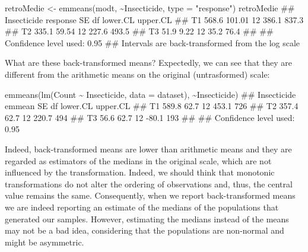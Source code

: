 \documentclass[a4paper,12pt,oneside]{book}
\newenvironment{Shaded}{\begin{snugshade}}{\end{snugshade}}
\newcommand{\SpecialCharTok}[1]{#1}
\newcommand{\StringTok}[1]{#1}
\newcommand{\DocumentationTok}[1]{#1}
\newcommand{\OtherTok}[1]{#1}
\newcommand{\FunctionTok}[1]{#1}
\newcommand{\AttributeTok}[1]{#1}
\newcommand{\NormalTok}[1]{#1}
\begin{document}
\begin{Shaded}
\begin{Highlighting}[]
\NormalTok{retroMedie }\OtherTok{\textless{}{-}} \FunctionTok{emmeans}\NormalTok{(modt, }\SpecialCharTok{\textasciitilde{}}\NormalTok{Insecticide, }
                      \AttributeTok{type =} \StringTok{"response"}\NormalTok{)}
\NormalTok{retroMedie}
\DocumentationTok{\#\#  Insecticide response     SE df lower.CL upper.CL}
\DocumentationTok{\#\#  T1             568.6 101.01 12    386.1    837.3}
\DocumentationTok{\#\#  T2             335.1  59.54 12    227.6    493.5}
\DocumentationTok{\#\#  T3              51.9   9.22 12     35.2     76.4}
\DocumentationTok{\#\# }
\DocumentationTok{\#\# Confidence level used: 0.95 }
\DocumentationTok{\#\# Intervals are back{-}transformed from the log scale}
\end{Highlighting}
\end{Shaded}

What are these back-transformed means? Expectedly, we can see that they are different from the arithmetic means on the original (untrasformed) scale:

\begin{Shaded}
\begin{Highlighting}[]
\FunctionTok{emmeans}\NormalTok{(}\FunctionTok{lm}\NormalTok{(Count }\SpecialCharTok{\textasciitilde{}}\NormalTok{ Insecticide, }\AttributeTok{data =}\NormalTok{ dataset), }\SpecialCharTok{\textasciitilde{}}\NormalTok{Insecticide)}
\DocumentationTok{\#\#  Insecticide emmean   SE df lower.CL upper.CL}
\DocumentationTok{\#\#  T1           589.8 62.7 12    453.1      726}
\DocumentationTok{\#\#  T2           357.4 62.7 12    220.7      494}
\DocumentationTok{\#\#  T3            56.6 62.7 12    {-}80.1      193}
\DocumentationTok{\#\# }
\DocumentationTok{\#\# Confidence level used: 0.95}
\end{Highlighting}
\end{Shaded}

Indeed, back-transformed means are lower than arithmetic means and they are regarded as estimators of the medians in the original scale, which are not influenced by the transformation. Indeed, we should think that monotonic transformations do not alter the ordering of observations and, thus, the central value remains the same. Consequently, when we report back-transformed means we are indeed reporting an estimate of the medians of the populations that generated our samples. However, estimating the medians instead of the means may not be a bad idea, considering that the populations are non-normal and might be asymmetric.
\end{document}

